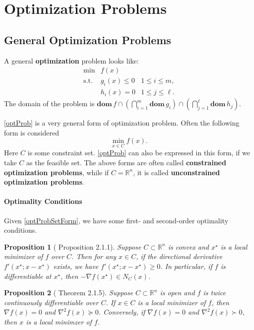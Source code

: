 \documentclass[openany]{book}
\newtheorem{proposition}{Proposition}[chapter]
\theoremstyle{definition}
\theoremstyle{remark}
\begin{document}
\section{Optimization Problems}
\subsection{General Optimization Problems}
A general \textbf{optimization} problem looks like:
\begin{equation}\label{optProb}
\begin{array}{lll}
\min & f(x) & \\
\mathrm{s.t.} & g_i(x)\le0 & 1\le i\le m, \\
 & h_i(x)=0 & 1\le j\le\ell.
\end{array}
\end{equation}
The domain of the problem is $\mathbf{dom}\,f\cap\left(\bigcap_{i=1}^m\mathbf{dom}\,g_i\right)\cap\left(\bigcap_{j=1}^{\ell}\mathbf{dom}\,h_j\right)$.

\eqref{optProb} is a very general form of optimization problem. Often the following form is considered
\begin{equation}\label{optProbSetForm}
    \min_{x\in C}f(x).
\end{equation}
Here $C$ is some constraint set. \eqref{optProb} can also be expressed in this form, if we take $C$ as the feasible set. The above forms are often called \textbf{constrained optimization problems}, while if $C=\mathbb{R}^n$, it is called \textbf{unconstrained optimization problems}.

\paragraph{Optimality Conditions}
Given \eqref{optProbSetForm}, we have some first- and second-order optimality conditions.
\begin{proposition}[\cite{BL10} Proposition 2.1.1]\label{optProbFirst}
    Suppose $C\subset \mathbb{R}^n$ is convex and $x^{\star}$ is a local minimizer of $f$ over $C$. Then for any $x\in C$, if the directional derivative $f'(x^{\star};x-x^{\star})$ exists, we have $f'(x^{\star};x-x^{\star})\ge0$. In particular, if $f$ is differentiable at $x^{\star}$, then $-\nabla f(x^{\star})\in N_C(x)$.
\end{proposition}
\begin{proposition}[\cite{BL10} Theorem 2.1.5]\label{optProbSecond}
    Suppose $C\subset \mathbb{R}^n$ is open and $f$ is twice continuously differentiable over $C$. If $x\in C$ is a local minimizer of $f$, then $\nabla f(x)=0$ and $\nabla^2f(x)\succeq0$. Conversely, if $\nabla f(x)=0$ and $\nabla^2f(x)\succ0$, then $x$ is a local minimzer of $f$.
\end{proposition}
\end{document}

